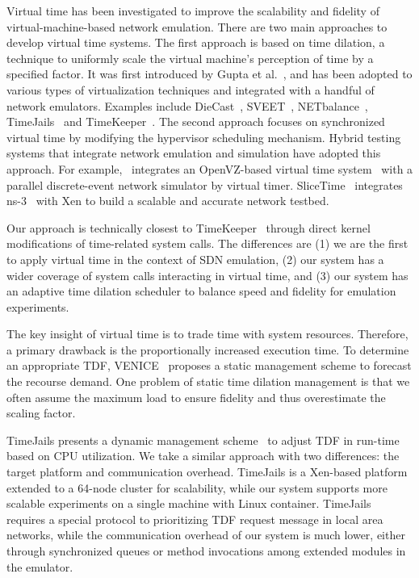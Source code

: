 \label{VT:Sec:RelatedWorks}

Virtual time has been investigated to improve the scalability and fidelity of virtual-machine-based network emulation. 
There are two main approaches to develop virtual time systems.
The first approach is based on time dilation, a technique to uniformly scale the virtual machine's perception of time by a specified factor. 
It was first introduced by Gupta et al.~\cite{ToInfinityBeyond},
and has been adopted to various types of virtualization techniques and integrated with a handful of network emulators. 
Examples include DieCast~\cite{DieCast}, SVEET~\cite{SVEET}, NETbalance~\cite{NETbalance}, TimeJails~\cite{ComparisonVR-VM, TimeJails} and TimeKeeper~\cite{TimeKeeper}. 
The second approach focuses on synchronized virtual time by modifying the hypervisor scheduling mechanism. 
Hybrid testing systems that integrate network emulation and simulation have adopted this approach. 
For example,~\cite{jin2012virtual} integrates an OpenVZ-based virtual time system~\cite{VirtTimeOpenVZ} with
a parallel discrete-event network simulator by virtual timer.
SliceTime~\cite{SliceTime} integrates ns-3~\cite{NS-3} with Xen to build a scalable and accurate network testbed.

Our approach is technically closest to TimeKeeper~\cite{TimeKeeper} through direct kernel modifications of time-related system calls. 
The differences are (1) we are the first to apply virtual time in the context of SDN emulation,
(2) our system has a wider coverage of system calls interacting in virtual time,
and (3) our system has an adaptive time dilation scheduler to balance speed and fidelity for emulation experiments.

The key insight of virtual time is to trade time with system resources. 
Therefore, a primary drawback is the proportionally increased execution time.
To determine an appropriate TDF, VENICE~\cite{VirtualTimeMachine} proposes a static management scheme to forecast the recourse demand. 
One problem of static time dilation management is that we often assume the maximum load to ensure fidelity and thus overestimate the scaling factor. 

TimeJails \cite{TimeJails} presents a dynamic management scheme~\cite{NtwkEmultAdaptVirtTime} to adjust TDF in run-time based on CPU utilization. 
We take a similar approach with two differences: the target platform and communication overhead.
TimeJails is a Xen-based platform extended to a 64-node cluster for scalability,
while our system supports more scalable experiments on a single machine with Linux container.
TimeJails requires a special protocol to prioritizing TDF request message in local area networks,
while the communication overhead of our system is much lower, either through synchronized queues or method invocations among extended modules in the emulator.

